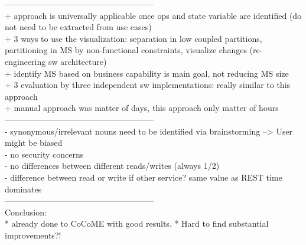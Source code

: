 ------------------------------------------------------\\
+ approach is universally applicable once ops and state variable are identified (do not need to be extracted from use cases) \\
+ 3 ways to use the visualization: separation in low coupled partitions, partitioning in MS by non-functional constraints, visualize changes (re-engineering sw architecture)\\
+ identify MS based on business capability is main goal, not reducing MS size\\
+ 3 evaluation by three independent sw implementations: really similar to this approach\\
+ manual approach was matter of days, this approach only matter of hours\\



------------------------------------------------------\\
- synonymous/irrelevant nouns need to be identified via brainstorming --> User might be biased\\
- no security concerns\\
- no differences between different reads/writes (always 1/2)\\
- difference between read or write if other service? same value as REST time dominates \\



------------------------------------------------------\\
Conclusion:\\
* already done to CoCoME with good results.
* Hard to find substantial improvements?!






